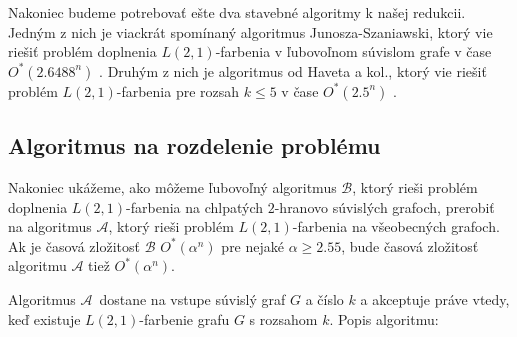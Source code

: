 Nakoniec budeme potrebovať ešte dva stavebné algoritmy k našej redukcii. Jedným z nich je
viackrát spomínaný algoritmus Junosza-Szaniawski, ktorý vie riešiť problém doplnenia $L(2,1)$-farbenia
v ľubovoľnom súvislom grafe v čase $O^*(2.6488^n)$ \cite{junosza_fast}. Druhým z nich je algoritmus od Haveta
a kol., ktorý vie riešiť problém $L(2,1)$-farbenia pre rozsah $k \leq 5$ v čase $O^*(2.5^n)$ \cite{havet}.

\subsection{Algoritmus na rozdelenie problému}

Nakoniec ukážeme, ako môžeme ľubovoľný algoritmus $\mathcal{B}$, ktorý rieši problém doplnenia
$L(2,1)$-farbenia na chlpatých $2$-hranovo súvislých grafoch, prerobiť na algoritmus $\mathcal{A}$, ktorý
rieši problém $L(2,1)$-farbenia na všeobecných grafoch. Ak je časová zložitosť $\mathcal{B}$
$O^*(\alpha^n)$ pre nejaké $\alpha \ge 2.55$, bude časová zložitosť algoritmu $\mathcal{A}$ tiež
$O^*(\alpha^n)$.

Algoritmus $\mathcal{A}$ dostane na vstupe súvislý graf $G$ a číslo $k$ a akceptuje práve vtedy,
keď existuje $L(2,1)$-farbenie grafu $G$ s rozsahom $k$. Popis algoritmu:

